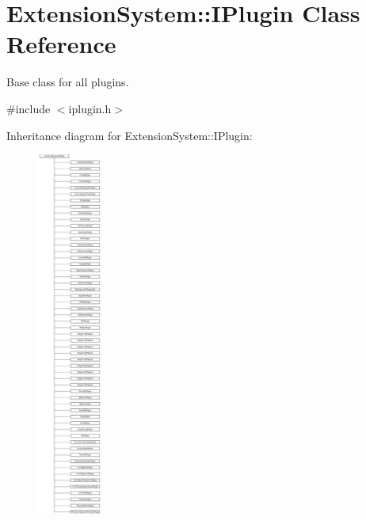 \hypertarget{class_extension_system_1_1_i_plugin}{\section{\-Extension\-System\-:\-:\-I\-Plugin \-Class \-Reference}
\label{class_extension_system_1_1_i_plugin}
}


\-Base class for all plugins.  




{\ttfamily \#include $<$iplugin.\-h$>$}

\-Inheritance diagram for \-Extension\-System\-:\-:\-I\-Plugin\-:\begin{figure}[H]
\begin{center}
\leavevmode
\includegraphics[height=12.000000cm]{class_extension_system_1_1_i_plugin}
\end{center}
\end{figure}
